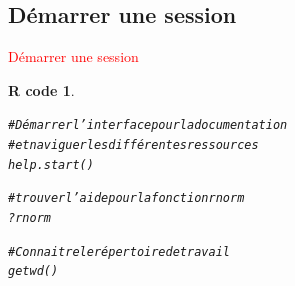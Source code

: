 \documentclass[11pt]{beamer}\usepackage[]{graphicx}\usepackage[]{color}
\makeatletter
\newcommand{\hlcom}[1]{\textcolor[rgb]{0.588,0.588,0.588}{#1}}%
\newcommand{\hlopt}[1]{\textcolor[rgb]{0.196,0.196,0.196}{#1}}%
\newcommand{\hlstd}[1]{\textcolor[rgb]{0.196,0.196,0.196}{#1}}%
\newcommand{\hlkwd}[1]{\textcolor[rgb]{0.78,0.227,0.412}{#1}}%
\newenvironment{kframe}{%
 \def\at@end@of@kframe{}%
 \ifinner\ifhmode%
  \def\at@end@of@kframe{\end{minipage}}%
  \begin{minipage}{\columnwidth}%
 \fi\fi%
 \def\FrameCommand##1{\hskip\@totalleftmargin \hskip-\fboxsep
 \colorbox{shadecolor}{##1}\hskip-\fboxsep
     \hskip-\linewidth \hskip-\@totalleftmargin \hskip\columnwidth}%
 \MakeFramed {\advance\hsize-\width
   \@totalleftmargin\z@ \linewidth\hsize
   \@setminipage}}%
 {\par\unskip\endMakeFramed%
 \at@end@of@kframe}
\newenvironment{knitrout}{}{} %
\newtheorem{rcode}{R code}[section]
\makeatother
\begin{document}








\subsection{D\'{e}marrer une session}

\begin{frame}
 \begin{center}
  \Huge{\textcolor{red}{D\'{e}marrer une session}}
 \end{center}
\end{frame}


\begingroup
\makeatletter
\setlength{\hoffset}{-.5\beamer@sidebarwidth}
\makeatother
\begin{frame}
\begin{knitrout}
\color{fgcolor}\begin{kframe}
\begin{rcode}\label{label}\begin{alltt}
\hlcom{# Démarrer l'interface pour la documentation}
\hlcom{# et naviguer les différentes ressources}
\hlkwd{help.start}\hlstd{()}

\hlcom{# trouver l'aide pour la fonction rnorm}
\hlopt{?}\hlstd{rnorm}

\hlcom{# Connaitre le répertoire de travail}
\hlkwd{getwd}\hlstd{()}
\end{alltt}
\end{rcode}\end{kframe}
\end{knitrout}
\end{frame}

\end{document}
